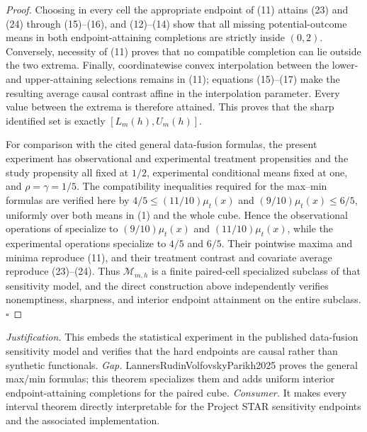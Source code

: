 \documentclass{article}
\begin{document}
\begin{proof}
Choosing in every cell the appropriate endpoint of (11) attains (23)
and (24) through (15)--(16), and (12)--(14) show that all missing
potential-outcome means in both endpoint-attaining completions are
strictly inside \((0,2)\).  Conversely, necessity of (11) proves that
no compatible completion can lie outside the two extrema.  Finally,
coordinatewise convex interpolation between the lower- and
upper-attaining selections remains in (11); equations (15)--(17) make
the resulting average causal contrast affine in the interpolation
parameter.  Every value between the extrema is therefore attained.
This proves that the sharp identified set is exactly
\([L_m(h),U_m(h)]\).

For comparison with the cited general data-fusion formulas, the present
experiment has observational and experimental treatment propensities
and the study propensity all fixed at \(1/2\), experimental conditional
means fixed at one, and \(\rho=\gamma=1/5\).  The compatibility
inequalities required for the max--min formulas are verified here by
\(4/5\leq(11/10)\mu_t(x)\) and
\((9/10)\mu_t(x)\leq6/5\), uniformly over both means in (1) and the
whole cube.  Hence the observational operations of
\cite[Lemma~1 and Theorem~1]{LannersRudinVolfovskyParikh2025}
specialize to \((9/10)\mu_t(x)\) and
\((11/10)\mu_t(x)\), while the experimental operations specialize to
\(4/5\) and \(6/5\).  Their pointwise maxima and minima reproduce
(11), and their treatment contrast and covariate average reproduce
(23)--(24).  Thus \(\mathcal M_{m,h}\) is a finite paired-cell
specialized subclass of that sensitivity model, and the direct
construction above independently verifies nonemptiness, sharpness, and
interior endpoint attainment on the entire subclass. \(\square\)
\end{proof}
\par\smallskip\noindent \textit{Justification.} This embeds the statistical experiment in the published data-fusion sensitivity model and verifies that the hard endpoints are causal rather than synthetic functionals. \textit{Gap.} LannersRudinVolfovskyParikh2025 proves the general max/min formulas; this theorem specializes them and adds uniform interior endpoint-attaining completions for the paired cube. \textit{Consumer.} It makes every interval theorem directly interpretable for the Project STAR sensitivity endpoints and the associated implementation.
\end{document}
